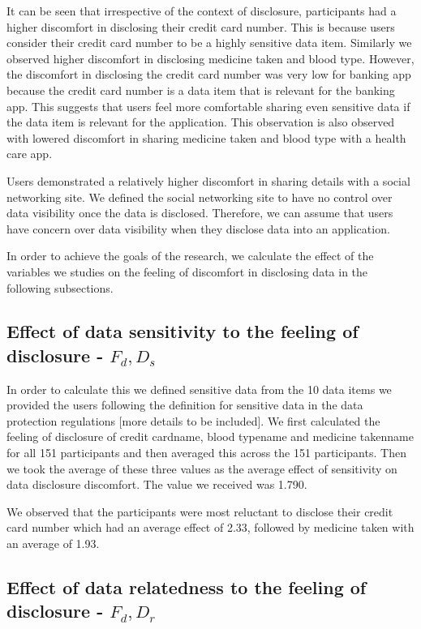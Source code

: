 \documentclass[10pt]{article}
\begin{document}
It can be seen that irrespective of the context of disclosure, participants had a higher discomfort in disclosing their credit card number. This is because users consider their credit card number to be a highly sensitive data item.  Similarly we observed higher discomfort in disclosing medicine taken and blood type. However, the discomfort in disclosing the credit card number was very low for banking app because the credit card number is a data item that is relevant for the banking app. This suggests that users feel more comfortable sharing even sensitive data if the data item is relevant for the application. This observation is also observed with lowered discomfort in sharing medicine taken and blood type with a health care app.

Users demonstrated a relatively higher discomfort in sharing details with a social networking site. We defined the social networking site to have no control over data visibility once the data is disclosed. Therefore, we can assume that users have concern over data visibility when they disclose data into an application. 

In order to achieve the goals of the research, we calculate the effect of the variables we studies on the feeling of discomfort in disclosing data in the following subsections.

\subsection{Effect of data sensitivity to the feeling of disclosure -  $F_d,D_s$}

In order to calculate this we defined sensitive data from the 10 data items we provided the users following the definition for sensitive data in the data protection regulations [more details to be included]. We first calculated the feeling of disclosure of credit card\/name, blood type\/name and medicine taken\/name for all 151 participants and then averaged this across the 151 participants. Then we took the average of these three values as the average effect of sensitivity on data disclosure discomfort. The value we received was 1.790. 

We observed that the participants were most reluctant to disclose their credit card number which had an average effect of 2.33, followed by medicine taken with an average of 1.93. 

\subsection{Effect of data relatedness to the feeling of disclosure -  $F_d,D_r$}
\end{document}

